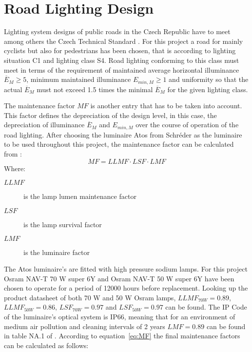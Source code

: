 \section{Road Lighting Design}
Lighting system designs of public roads in the Czech Republic have to meet among others the Czech Technical Standard \cite{CSN_EN_13201-2}. For this project a road for mainly cyclists but also for pedestrians has been chosen, that is according to \cite{CSN_EN_13201-1} lighting situation C1 and lighting class S4. Road lighting conforming to this class must meet in terms of \cite{CSN_EN_13201-2} the requirement of maintained average horizontal illuminance $\overline{E}_{M}\geq 5$, minimum maintained illuminance $E_{min,M}\geq 1$ and uniformity so that the actual $\overline{E}_{M}$ must not exceed 1.5 times the minimal $\overline{E}_{M}$ for the given lighting class.

The maintenance factor $MF$ is another entry that has to be taken into account. This factor defines the depreciation of the design level, in this case, the depreciation of illuminance $\overline{E}_{M}$ and $E_{min,M}$ over the course of operation of the road lighting. After choosing the luminaire Atos from Schr\'{e}der as the luminaire to be used throughout this project, the maintenance factor can be calculated from \cite{CSN_EN_13201-2_Z1}:
\begin{equation} \label{eq:MF}
MF = LLMF \cdot LSF \cdot LMF
\end{equation}
Where:
\begin{description}
	\item[$LLMF$] is the lamp lumen maintenance factor
	\item[$LSF$] is the lamp survival factor
	\item[$LMF$] is the luminaire factor
\end{description}

The Atos luminaire's are fitted with high pressure sodium lamps. For this project Osram NAV-T 70 W super 6Y and Osram NAV-T 50 W super 6Y have been chosen to operate for a period of 12000 hours before replacement. Looking up the product datasheet \cite{Osram} of both 70 W and 50 W Osram lamps, $LLMF_{70W}=0.89$, $LLMF_{50W}=0.86$, $LSF_{70W}=0.97$ and $LSF_{50W}=0.97$ can be found. The IP Code of the luminaire's optical system is IP66, meaning that for an environment of medium air pollution and cleaning intervals of 2 years $LMF=0.89$ can be found in table NA.1 of \cite{CSN_EN_13201-2_Z1}. According to equation~\ref{eq:MF} the final maintenance factors can be calculated as follows:

